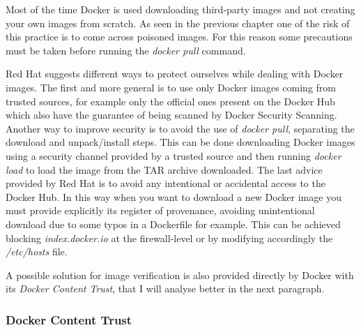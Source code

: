 \documentclass[a4paper,12pt]{article}
\begin{document}
Most of the time Docker is used downloading third-party images and not creating
your own images from scratch. As seen in the previous chapter one of the risk of
this practice is to come across poisoned images. For this reason some
precautions must be taken before running the \textit{docker pull} command. \par
Red Hat suggests \cite{docker_image_insecurity} different ways to protect
ourselves while dealing with Docker images. The first and more general is to use
only Docker images coming from trusted sources, for example only the official
ones present on the Docker Hub which also have the guarantee of being scanned by
Docker Security Scanning. Another way to improve security is to avoid the use of
\textit{docker pull}, separating the download and unpack/install steps. This can
be done downloading Docker images using a security channel provided by a trusted
source and then running \textit{docker load} to load the image from the TAR
archive downloaded. The last advice provided by Red Hat is to avoid any
intentional or accidental access to the Docker Hub. In this way when you want to
download a new Docker image you must provide explicitly its register of
provenance, avoiding unintentional download due to some typos in a Dockerfile
for example. This can be achieved blocking \textit{index.docker.io} at the
firewall-level or by modifying accordingly the \textit{/etc/hosts} file. \par A
possible solution for image verification is also provided directly by Docker
with its \textit{Docker Content Trust}, that I will analyse better in the next
paragraph.

\subsubsection{Docker Content Trust}
\end{document}
